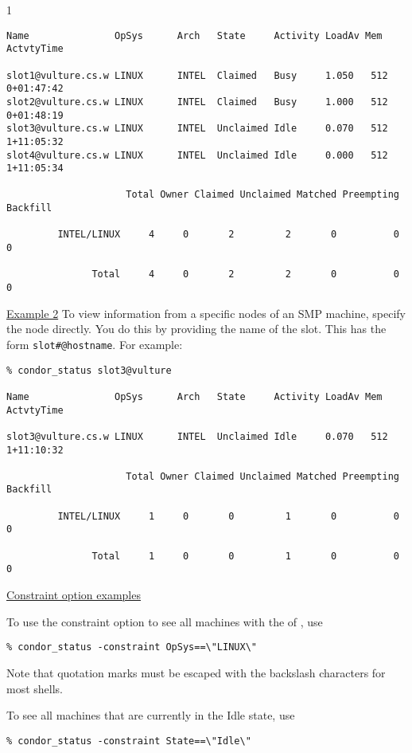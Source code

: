 \begin{ManPage}{\label{man-condor-status}}{1}
\begin{verbatim}
Name               OpSys      Arch   State     Activity LoadAv Mem   ActvtyTime

slot1@vulture.cs.w LINUX      INTEL  Claimed   Busy     1.050   512  0+01:47:42
slot2@vulture.cs.w LINUX      INTEL  Claimed   Busy     1.000   512  0+01:48:19
slot3@vulture.cs.w LINUX      INTEL  Unclaimed Idle     0.070   512  1+11:05:32
slot4@vulture.cs.w LINUX      INTEL  Unclaimed Idle     0.000   512  1+11:05:34

                     Total Owner Claimed Unclaimed Matched Preempting Backfill

         INTEL/LINUX     4     0       2         2       0          0        0

               Total     4     0       2         2       0          0        0
\end{verbatim}
\normalsize


\underline{Example 2} To view information from a specific nodes of an
SMP machine, specify the node directly.
You do this by providing the name of the slot.
This has the form \texttt{slot\#@hostname}.
For example:
\footnotesize
\begin{verbatim}
% condor_status slot3@vulture

Name               OpSys      Arch   State     Activity LoadAv Mem   ActvtyTime

slot3@vulture.cs.w LINUX      INTEL  Unclaimed Idle     0.070   512  1+11:10:32

                     Total Owner Claimed Unclaimed Matched Preempting Backfill

         INTEL/LINUX     1     0       0         1       0          0        0

               Total     1     0       0         1       0          0        0
\end{verbatim}
\normalsize

\underline{Constraint option examples}

To use the constraint option to see all machines with the 
of , use
\begin{verbatim}
% condor_status -constraint OpSys==\"LINUX\"
\end{verbatim}
Note that quotation marks must be escaped with the backslash characters
for most shells.

To see all machines that are currently in the Idle state, use
\begin{verbatim}
% condor_status -constraint State==\"Idle\"
\end{verbatim}


\end{ManPage}
